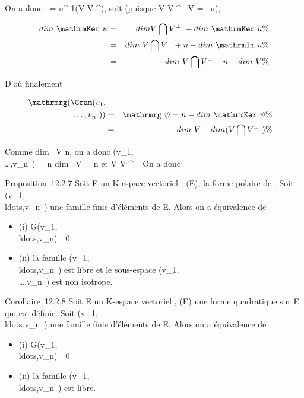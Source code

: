 \documentclass[]{article}
\begin{document}
On a donc \mathrmKer~\psi =
u^-1(V \bigcap V ^\bot), soit (puisque V \bigcap V ^\bot\subset~
V = \mathrmIm~u),

\begin{align*} dim~
\mathrmKer~\psi& =&
dim V \bigcap V ^\bot~
+ dim~
\mathrmKer~u \%&
\\ & =& dim~ V
\bigcap V ^\bot + n - dim~
\mathrmIm~u\%&
\\ & =& dim~ V
\bigcap V ^\bot + n - dim~ V \%&
\\ \end{align*}

D'où finalement

\begin{align*}
\mathrmrg(\Gram(v_1,\\\ldots,v_n~))&
=& \mathrmrg~\psi = n
- dim~
\mathrmKer~\psi \%&
\\ & =& dim~ V
- dim (V \bigcap V ^\bot~)\%&
\\ \end{align*}

Comme dim~ V \leq n, on a donc
\mathrmrg\Gram(v_1,\\\ldots,v_n~)
= n \Leftrightarrow dim~ V = n et
V \bigcap V ^\bot = \0\. On a donc

Proposition~12.2.7 Soit E un K-espace vectoriel , \Phi \inQ(E), \phi la forme
polaire de \Phi. Soit
(v_1,\\ldots,v_n~)
une famille finie d'éléments de E. Alors on a équivalence de

\begin{itemize}
\itemsep1pt\parskip0pt
\item
  (i)
  G(v_1,\\ldots,v_n)\mathrel\neq~~0
\item
  (ii) la famille
  (v_1,\\ldots,v_n~)
  est libre et le sous-espace
  \mathrmVect(v_1,\\\ldots,v_n~)
  est non isotrope.
\end{itemize}

Corollaire~12.2.8 Soit E un K-espace vectoriel , \Phi \inQ(E) une forme
quadratique sur E qui est définie. Soit
(v_1,\\ldots,v_n~)
une famille finie d'éléments de E. Alors on a équivalence de

\begin{itemize}
\itemsep1pt\parskip0pt
\item
  (i)
  G(v_1,\\ldots,v_n)\mathrel\neq~~0
\item
  (ii) la famille
  (v_1,\\ldots,v_n~)
  est libre.
\end{itemize}
\end{document}

